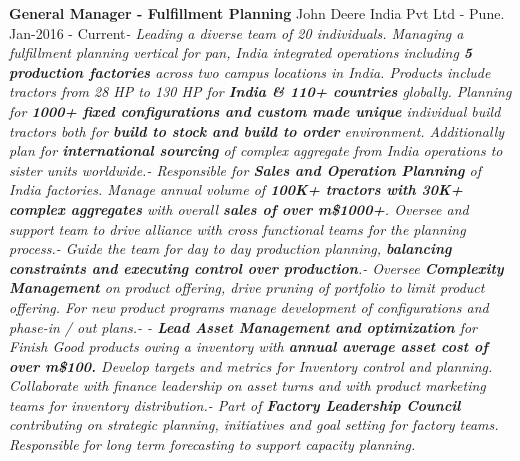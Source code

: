 \documentclass[11pt, a4paper]{awesome-cv}
\begin{document}
\textbf{General Manager - Fulfillment Planning} \hfill John Deere India
Pvt Ltd - Pune\newline . \hfill Jan-2016 -
Current\newline \textit{- \hspace{5mm}  Leading a diverse team of 20 individuals. Managing a fulfillment planning vertical for pan, India integrated operations including \textbf{5 production factories} across two campus locations in India. Products include tractors from 28 HP to 130 HP for \textbf{India \& 110+ countries} globally. Planning for \textbf{1000+ fixed configurations and custom made unique} individual build tractors both for \textbf{build to stock and build to order} environment. Additionally plan for \textbf{international sourcing} of complex aggregate from India operations to sister units worldwide.\newline - \hspace{5mm}  Responsible  for \textbf{Sales and Operation Planning} of India factories.  Manage annual volume of \textbf{100K+ tractors with 30K+ complex aggregates} with overall \textbf{sales of over m\$1000+}. Oversee and support team to drive alliance with cross functional teams for the planning process.\newline - \hspace{5mm}  Guide the team for day to day production planning,  \textbf{balancing constraints and executing control over production}.\newline - \hspace{5mm}  Oversee \textbf{Complexity Management} on product offering, drive pruning of portfolio to limit product offering. For new product programs manage development of configurations and phase-in / out plans.\newline - \hspace{5mm}  \newpage  - \hspace{5mm} \textbf{Lead Asset Management and optimization} for Finish Good products owing a inventory with \textbf{annual average asset cost of over m\$100.}  Develop targets and metrics for Inventory control and planning. Collaborate with finance leadership on asset turns and with product marketing teams for inventory distribution.\newline - \hspace{5mm}  Part of  \textbf{Factory Leadership Council} contributing on strategic planning, initiatives and goal setting for factory teams. Responsible for  long term forecasting to support capacity planning.}
\newline \vspace{2mm} \newline
\end{document}
